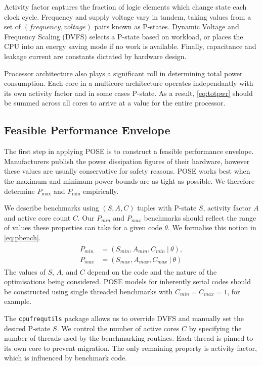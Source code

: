 Activity factor captures the fraction of logic elements which change state each clock cycle.
Frequency and supply voltage vary in tandem, taking values from a set of $(frequency, voltage)$ pairs known as P-states.
Dynamic Voltage and Frequency Scaling (DVFS) selects a P-state based on workload, or places the CPU into an energy saving mode if no work is available.
Finally, capacitance and leakage current are constants dictated by hardware design.

Processor architecture also plays a significant roll in determining total power consumption.
Each core in a multicore architecture operates independantly with its own activity factor and in some cases P-state.
As a result, \autoref{eq:totpwr} should be summed across all cores to arrive at a value for the entire processor.

\subsection{Feasible Performance Envelope}
The first step in applying POSE is to construct a feasible performance envelope.
Manufacturers publish the power dissipation figures of their hardware, however these values are usually conservative for safety reasons.
POSE works best when the maximum and minimum power bounds are as tight as possible.
We therefore determine $P_{\max}$ and $P_{\min}$ empirically.

We describe benchmarks using $(S,A,C)$ tuples with P-state $S$, activity factor $A$ and active core count $C$.
Our $P_{min}$ and $P_{max}$ benchmarks should reflect the range of values these properties can take for a given code $\theta$.
We formalise this notion in \autoref{eq:pbench}.
\begin{align}
  \label{eq:pbench}
  \begin{split}
    P_{min} &= (S_{min}, A_{min}, C_{min}~\vert~\theta), \\
    P_{max} &= (S_{max}, A_{max}, C_{max}~\vert~\theta) 
  \end{split}
\end{align}
The values of $S$, $A$, and $C$ depend on the code and the nature of the optimisations being considered.
POSE models for inherently serial codes should be constructed using single threaded benchmarks with $C_{min} = C_{max} = 1$, for example.

The \texttt{cpufrequtils} package allows us to override DVFS and manually set the desired P-state $S$.
We control the number of active cores $C$ by specifying the number of threads used by the benchmarking routines.
Each thread is pinned to its own core to prevent migration.
The only remaining property is activity factor, which is influenced by benchmark code.

